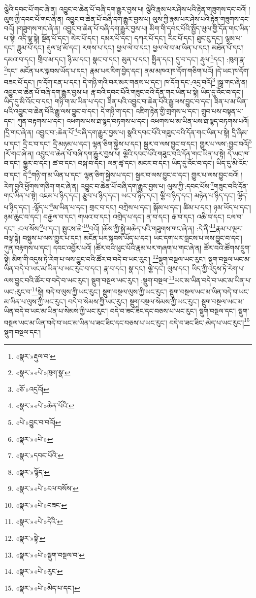 ལྕེའི་དབང་པོ་གང་ཞེ་ན། འབྱུང་བ་ཆེན་པོ་བཞི་དག་རྒྱུར་བྱས་པ། ལྕེའི་རྣམ་པར་ཤེས་པའི་རྟེན་གཟུགས་དང་བའོ། །ལུས་ཀྱི་དབང་པོ་གང་ཞེ་ན། འབྱུང་བ་ཆེན་པོ་བཞི་དག་རྒྱུར་བྱས་པ། ལུས་ཀྱི་རྣམ་པར་ཤེས་པའི་རྟེན་གཟུགས་དང་བའོ། །གཟུགས་གང་ཞེ་ན། འབྱུང་བ་ཆེན་པོ་བཞི་དག་རྒྱུར་བྱས་པ། མིག་གི་དབང་པོའི་སྤྱོད་ཡུལ་གྱི་དོན་གང་ཡིན་པ་སྟེ། འདི་ལྟ་སྟེ། སྔོན་པོ་དང་། སེར་པོ་དང་། དམར་པོ་དང་། དཀར་པོ་དང་། རིང་པོ་དང་། ཐུང་ངུ་དང་། ལྷམ་པ་དང་། ཟླུམ་པོ་དང་། རྡུལ་ཕྲ་མོ་དང་། རགས་པ་དང་། ཕྱལ་ལེ་བ་དང་། ཕྱལ་ལེ་བ་མ་ཡིན་པ་དང་། མཐོན་པོ་དང་། དམའ་བ་དང་། གྲིབ་མ་དང་། ཉི་མ་དང་། སྣང་བ་དང་། མུན་པ་དང་། སྤྲིན་དང་། དུ་བ་དང་། རྡུལ་\footnote{«སྣར་»རྡུལ་བ་}དང་། :ཁུག་རྣ་\footnote{«སྣར་»«པེ་»ཁུག་སྣ་}དང་། མངོན་པར་སྐབས་ཡོད་པ་དང་། རྣམ་པར་རིག་བྱེད་དང་། ནམ་མཁའ་ཁ་དོག་གཅིག་པའོ། །དེ་ཡང་ཁ་དོག་བཟང་པོ་དང་། ཁ་དོག་ངན་པ་དང་། དེ་གཉི་གའི་བར་མར་གནས་པ་དང་། ཁ་དོག་དང་:འདྲ་བའོ།\footnote{«ཅོ་»འདྲའོ།} །སྒྲ་གང་ཞེ་ན། འབྱུང་བ་ཆེན་པོ་བཞི་དག་རྒྱུར་བྱས་པ། རྣ་བའི་དབང་པོའི་གཟུང་བའི་དོན་གང་ཡིན་པ་སྟེ། ཡིད་དུ་འོང་བ་དང་། ཡིད་དུ་མི་འོང་བ་དང་། གཉི་ག་མ་ཡིན་པ་དང་། ཟིན་པའི་འབྱུང་བ་ཆེན་པོའི་རྒྱུ་ལས་བྱུང་བ་དང་། ཟིན་པ་མ་ཡིན་པའི་འབྱུང་བ་ཆེན་པོའི་རྒྱུ་ལས་བྱུང་བ་དང་། དེ་གཉི་ག་དང་། འཇིག་རྟེན་གྱི་གྲགས་པ་དང་། གྲུབ་པས་བསྟན་པ་དང་། ཀུན་བརྟགས་པ་དང་། འཕགས་པས་ཐ་སྙད་བཏགས་པ་དང་། འཕགས་པ་མ་ཡིན་པས་ཐ་སྙད་བཏགས་པའོ། །དྲི་གང་ཞེ་ན། འབྱུང་བ་:ཆེན་པོ་\footnote{«སྣར་»«པེ་»ཆེན་པོའི་}བཞི་དག་རྒྱུར་བྱས་པ། སྣའི་དབང་པོའི་གཟུང་བའི་དོན་གང་ཡིན་པ་སྟེ། དྲི་ཞིམ་པ་དང་། དྲི་ང་བ་དང་། དྲི་མཉམ་པ་དང་། ལྷན་ཅིག་སྐྱེས་པ་དང་། སྦྱར་བ་ལས་བྱུང་བ་དང་། གྱུར་པ་ལས་:བྱུང་བའོ།\footnote{«པེ་»བྱུང་བ་བའོ།} །རོ་གང་ཞེ་ན། འབྱུང་བ་ཆེན་པོ་བཞི་དག་རྒྱུར་བྱས་པ། ལྕེའི་དབང་པོའི་གཟུང་བའི་དོན་གང་ཡིན་པ་སྟེ། དེ་ཡང་ཁ་བ་དང་། སྐྱུར་བ་དང་། ཚ་བ་དང་། བསྐ་བ་དང་། ལན་ཚྭ་དང་། མངར་བ་དང་། ཡིད་དུ་འོང་བ་དང་། ཡིད་དུ་མི་འོང་བ་དང་། དེ་\footnote{«སྣར་»«པེ་»}གཉི་ག་མ་ཡིན་པ་དང་། ལྷན་ཅིག་སྐྱེས་པ་དང་། སྦྱར་བ་ལས་བྱུང་བ་དང་། གྱུར་པ་ལས་བྱུང་བའོ། །རེག་བྱའི་ཕྱོགས་གཅིག་གང་ཞེ་ན། འབྱུང་བ་ཆེན་པོ་བཞི་དག་རྒྱུར་བྱས་པ། ལུས་ཀྱི་:དབང་པོས་\footnote{«སྣར་»དབང་པོའི་}གཟུང་བའི་དོན་གང་ཡིན་པ་སྟེ། འཇམ་པ་ཉིད་དང་། རྩུབ་པ་ཉིད་དང་། ཡང་བ་ཉིད་དང་། ལྕི་བ་ཉིད་དང་། མཉེན་པ་ཉིད་དང་། ལྷོད་པ་ཉིད་དང་། :ལྷོད་པ་\footnote{«སྣར་»ལྷོད་}མ་ཡིན་པ་དང་། གྲང་བ་དང་། བཀྲེས་པ་དང་། སྐོམ་པ་དང་། ཚིམ་པ་དང་། ཉམ་ཡོད་པ་དང་། ཉམ་ཆུང་བ་དང་། བརྒྱལ་བ་དང་། གཡའ་བ་དང་། འགྲེད་པ་དང་། ན་བ་དང་། རྒ་བ་དང་། འཆི་བ་དང་། ངལ་བ་དང་། :ངལ་སོས་\footnote{«སྣར་»«པེ་»ངལ་བསོས་}པ་དང་། སྤུངས་ཆེ་\footnote{«སྣར་»«པེ་»བཟང་}བའོ། །ཆོས་ཀྱི་སྐྱེ་མཆེད་པའི་གཟུགས་གང་ཞེ་ན། :དེ་ནི་\footnote{«སྣར་»«པེ་»དེའི་}རྣམ་པ་ལྔར་བལྟ་སྟེ། བསྡུས་པ་ལས་གྱུར་པ་དང་། མངོན་པར་སྐབས་ཡོད་པ་དང་། ཡང་དག་པར་བླངས་པ་ལས་བྱུང་བ་དང་། ཀུན་བརྟགས་པ་དང་། དབང་འབྱོར་པའོ། །ཚོར་བའི་ཕུང་པོའི་རྣམ་པར་གཞག་པ་གང་ཞེ་ན། ཚོར་བའི་ཚོགས་དྲུག་སྟེ། མིག་གི་འདུས་ཏེ་རེག་པ་ལས་བྱུང་བའི་ཚོར་བ་བདེ་བ་ཡང་རུང་། \footnote{«སྣར་»སྟེ་}སྡུག་བསྔལ་ཡང་རུང་། སྡུག་བསྔལ་ཡང་མ་ཡིན་བདེ་བ་ཡང་མ་ཡིན་པ་ཡང་རུང་བ་དང་། རྣ་བ་དང་། སྣ་དང་། ལྕེ་དང་། ལུས་དང་། ཡིད་ཀྱི་འདུས་ཏེ་རེག་པ་ལས་བྱུང་བའི་ཚོར་བ་བདེ་བ་ཡང་རུང་། སྡུག་བསྔལ་ཡང་རུང་། :སྡུག་བསྔལ་\footnote{«སྣར་»«པེ་»སྡུག་བསྔལ་བ་}ཡང་མ་ཡིན་བདེ་བ་ཡང་མ་ཡིན་པ་ཡང་:རུང་བ་\footnote{«སྣར་»«པེ་»རུང་}སྟེ། བདེ་བ་ལུས་ཀྱི་ཡང་རུང་། སྡུག་བསྔལ་ལུས་ཀྱི་ཡང་རུང་། སྡུག་བསྔལ་ཡང་མ་ཡིན་བདེ་བ་ཡང་མ་ཡིན་པ་ལུས་ཀྱི་ཡང་རུང་། བདེ་བ་སེམས་ཀྱི་ཡང་རུང་། སྡུག་བསྔལ་སེམས་ཀྱི་ཡང་རུང་། སྡུག་བསྔལ་ཡང་མ་ཡིན་བདེ་བ་ཡང་མ་ཡིན་པ་སེམས་ཀྱི་ཡང་རུང་། བདེ་བ་ཟང་ཟིང་དང་བཅས་པ་ཡང་རུང་། སྡུག་བསྔལ་དང་། སྡུག་བསྔལ་ཡང་མ་ཡིན་བདེ་བ་ཡང་མ་ཡིན་པ་ཟང་ཟིང་དང་བཅས་པ་ཡང་རུང་། བདེ་བ་ཟང་ཟིང་:མེད་པ་ཡང་རུང་།\footnote{«སྣར་»«པེ་»མེད་པ་དང་།} སྡུག་བསྔལ་དང་། 